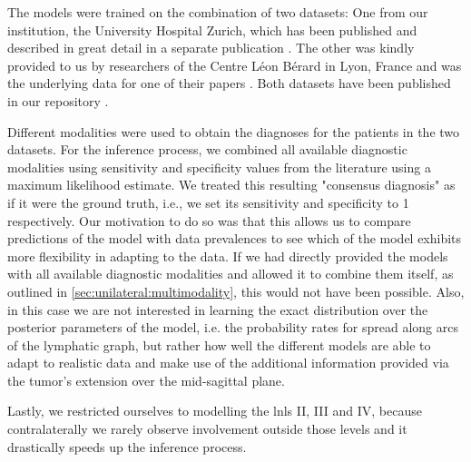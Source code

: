 \documentclass[\relativeRoot/main.tex]{subfiles}
\begin{document}
The models were trained on the combination of two datasets: One from our institution, the University Hospital Zurich, which has been published and described in great detail in a separate publication \cite{ludwig_dataset_2021}. The other was kindly provided to us by researchers of the Centre Léon Bérard in Lyon, France and was the underlying data for one of their papers \cite{bauwens_prevalence_2021}. Both datasets have been published in our repository .

Different modalities were used to obtain the diagnoses for the patients in the two datasets. For the inference process, we combined all available diagnostic modalities using sensitivity and specificity values from the literature \cite{de_bondt_detection_2007} using a maximum likelihood estimate. We treated this resulting "consensus diagnosis" as if it were the ground truth, i.e., we set its sensitivity and specificity to 1 respectively. Our motivation to do so was that this allows us to compare predictions of the model with data prevalences to see which of the model exhibits more flexibility in adapting to the data. If we had directly provided the models with all available diagnostic modalities and allowed it to combine them itself, as outlined in \cref{sec:unilateral:multimodality}, this would not have been possible. Also, in this case we are not interested in learning the exact distribution over the posterior parameters of the model, i.e. the probability rates for spread along arcs of the lymphatic graph, but rather how well the different models are able to adapt to realistic data and make use of the additional information provided via the tumor's extension over the mid-sagittal plane.

Lastly, we restricted ourselves to modelling the \glspl{lnl} II, III and IV, because contralaterally we rarely observe involvement outside those levels and it drastically speeds up the inference process.
\end{document}
